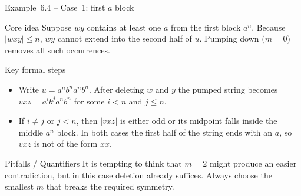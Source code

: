 \begin{frame}[t]{Example 6.4 – Case 1: first $a$ block}
  \begin{tblock}{Core idea}
    Suppose $w y$ contains at least one $a$ from the first block
    $a^n$.  Because $|w x y| \le n$, $w y$ cannot extend into the
    second half of $u$.  Pumping down ($m=0$) removes all such
    occurrences.
  \end{tblock}
  \begin{tblock}{Key formal steps}
    \begin{itemize}
      \item Write $u = a^n b^n a^n b^n$.  After deleting $w$ and $y$ the
        pumped string becomes $v x z = a^i b^j a^n b^n$ for some
        $i< n$ and $j \le n$.
      \item If $i \ne j$ or $j<n$, then $|v x z|$ is either odd or its
        midpoint falls inside the middle $a^n$ block.  In both cases
        the first half of the string ends with an $a$, so $v x z$ is
        not of the form $x x$.
    \end{itemize}
  \end{tblock}
  \begin{talert}{Pitfalls / Quantifiers}
    It is tempting to think that $m=2$ might produce an easier
    contradiction, but in this case deletion already suffices.  Always
    choose the smallest $m$ that breaks the required symmetry.
  \end{talert}
  \label{fr:6.1-15}
\end{frame}

